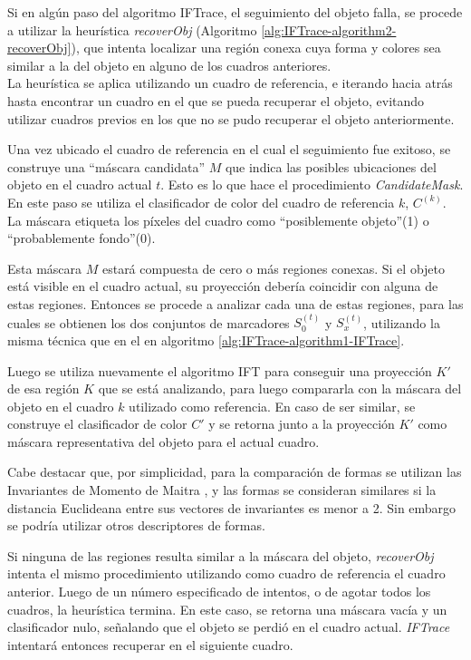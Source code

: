 \documentclass[a4paper,10pt]{article}
\begin{document}
Si en algún paso del algoritmo IFTrace, el seguimiento del objeto falla, se
procede a utilizar la heurística \textit{recoverObj} (Algoritmo \ref{alg:IFTrace-algorithm2-recoverObj}), que intenta localizar una
región conexa cuya forma y colores sea similar a la del objeto en alguno de los
cuadros anteriores.\\

La heurística se aplica utilizando un cuadro de referencia, e iterando hacia atrás
hasta encontrar un cuadro en el que se pueda recuperar el objeto, evitando
utilizar cuadros previos en los que no se pudo recuperar el objeto anteriormente.

Una vez ubicado el cuadro de referencia en el cual el seguimiento fue exitoso,
se construye una ``máscara candidata'' $M$ que indica las posibles ubicaciones
del objeto en el cuadro actual $t$. Esto es lo que hace el procedimiento \textit{CandidateMask}.
En este paso se
utiliza el clasificador de color del cuadro de referencia $k$, $C^{(k)}$. La máscara
etiqueta los píxeles del cuadro como ``posiblemente objeto''(1) o
``probablemente fondo''(0).

Esta máscara $M$ estará compuesta de cero
o más regiones conexas. Si el objeto está visible en el cuadro actual,
su proyección debería coincidir con alguna de estas regiones. Entonces
se procede a analizar cada una de estas regiones, para las cuales se obtienen
los dos conjuntos de marcadores $S_{0}^{(t)}$ y $S_{x}^{(t)}$, utilizando la misma técnica que en el
en algoritmo \ref{alg:IFTrace-algorithm1-IFTrace}.

 Luego se utiliza
nuevamente el algoritmo IFT para conseguir una proyección $K'$ de esa región $K$ que
se está analizando, para luego compararla con la máscara del objeto en el cuadro
$k$ utilizado como referencia. En caso de ser similar, se construye el clasificador
de color $C'$ y se retorna junto a la proyección $K'$ como máscara representativa
del objeto para el actual cuadro.

Cabe destacar que, por simplicidad, para la comparación de formas se utilizan
las Invariantes de Momento de Maitra \cite{MaitraMomentInvariants}, y las formas se consideran similares
si la distancia Euclideana entre sus vectores de invariantes es menor a 2.
Sin embargo se podría utilizar otros descriptores de formas.

Si ninguna de las regiones resulta similar a la máscara del objeto,
\textit{recoverObj} intenta el mismo procedimiento utilizando como cuadro de
referencia el cuadro anterior. Luego de un número especificado de intentos, o
de agotar todos los cuadros, la heurística termina. En este caso, se retorna
una máscara vacía y un clasificador nulo, señalando que el objeto se perdió en
el cuadro actual. \textit{IFTrace} intentará entonces recuperar en el siguiente
cuadro.
\end{document}
